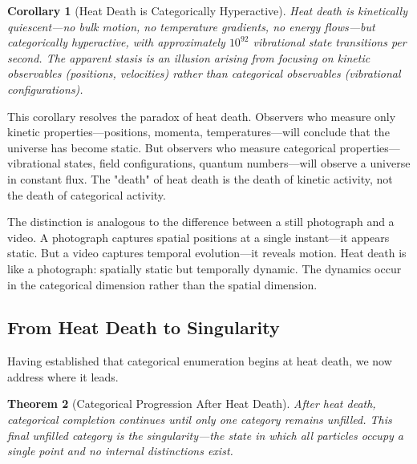 \documentclass[12pt,a4paper]{article}
\newtheorem{theorem}{Theorem}[section]
\newtheorem{corollary}[theorem]{Corollary}
\theoremstyle{definition}
\theoremstyle{remark}
\begin{document}
\begin{corollary}[Heat Death is Categorically Hyperactive]
\label{cor:hyperactive}
Heat death is kinetically quiescent—no bulk motion, no temperature gradients, no energy flows—but categorically hyperactive, with approximately $10^{92}$ vibrational state transitions per second. The apparent stasis is an illusion arising from focusing on kinetic observables (positions, velocities) rather than categorical observables (vibrational configurations).
\end{corollary}

This corollary resolves the paradox of heat death. Observers who measure only kinetic properties—positions, momenta, temperatures—will conclude that the universe has become static. But observers who measure categorical properties—vibrational states, field configurations, quantum numbers—will observe a universe in constant flux. The "death" of heat death is the death of kinetic activity, not the death of categorical activity.

The distinction is analogous to the difference between a still photograph and a video. A photograph captures spatial positions at a single instant—it appears static. But a video captures temporal evolution—it reveals motion. Heat death is like a photograph: spatially static but temporally dynamic. The dynamics occur in the categorical dimension rather than the spatial dimension.

\subsection{From Heat Death to Singularity}

Having established that categorical enumeration begins at heat death, we now address where it leads.

\begin{theorem}[Categorical Progression After Heat Death]
\label{thm:progression}
After heat death, categorical completion continues until only one category remains unfilled. This final unfilled category is the singularity—the state in which all particles occupy a single point and no internal distinctions exist.
\end{theorem}
\end{document}
